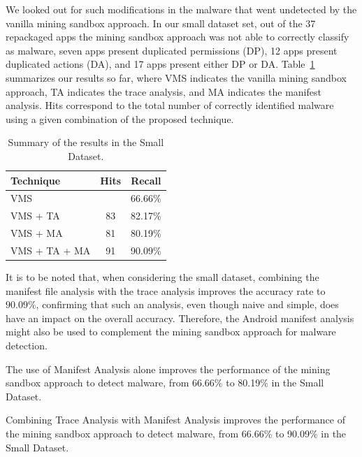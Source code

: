We looked out for such modifications in the malware that went undetected by the
vanilla mining sandbox approach. In our small dataset set, out of the 37 repackaged apps the mining sandbox approach was not
able to correctly classify as malware, seven apps present duplicated permissions (DP), 12 apps present duplicated actions (DA), and
17 apps present either DP or DA. Table~\ref{tab:mfa} summarizes our results so far, where
VMS indicates the vanilla mining
sandbox approach, TA indicates the trace analysis, and MA indicates the manifest analysis.
Hits correspond to the total number of correctly identified malware using a given
combination of the proposed technique.

\begin{table}[ht]
  \caption{Summary of the results in the Small Dataset.}
  \centering
  \begin{small}
  \begin{tabular}{lcc}\toprule
  Technique      & Hits & Recall \\ \midrule 
  VMS            &      & \num{66.66}\% \\ 
  VMS + TA       & 83   & \num{82.17}\%  \\
  VMS + MA       & 81   & \num{80.19}\% \\
  VMS + TA + MA  & 91   & \num{90.09}\% \\  \bottomrule
  \end{tabular}
  \end{small}
 \label{tab:mfa}
\end{table}

It is to be noted that, when considering the small dataset, combining the manifest file analysis with the trace analysis
improves the accuracy rate to $90.09\%$, confirming that such an analysis, even though naive and simple,
does have an impact on the overall accuracy. Therefore, the Android manifest
analysis might also be used to complement the mining sandbox approach for malware detection.  


\begin{obs}{2}{}
  The use of Manifest Analysis alone improves the performance
  of the mining sandbox approach to detect malware,
  from \num{66.66}\% to \num{80.19}\% in the
  Small Dataset. 
\end{obs}



\begin{obs}{3}{}
  Combining Trace Analysis with Manifest Analysis improves the performance
  of the mining sandbox approach to detect malware,
  from \num{66.66}\% to \num{90.09}\% in the
  Small Dataset. 
\end{obs}

